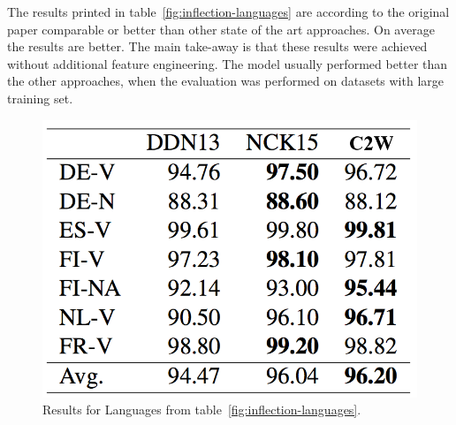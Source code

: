 The results printed in table~\ref{fig:inflection-languages} are according to the original paper
comparable or better than other state of the art approaches. On average the results are better.
The main take-away is that these results were achieved without additional feature engineering. 
The model usually performed better than the other approaches, when the evaluation was performed on datasets with large training set.
\begin{figure}[H]
\begin{center}
  \includegraphics[width=.4\linewidth]{../slides/images/evaluation_inflections}
  \caption{Results for Languages from table~\ref{fig:inflection-languages}.}
  \label{fig:inflection-eval}
\end{center}
\end{figure}

